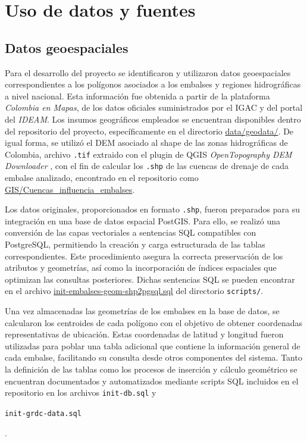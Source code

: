 \chapter{Uso de datos y fuentes}
\label{chp:3}

\section{Datos geoespaciales}
\label{sec:chp3-1}

Para el desarrollo del proyecto se identificaron y utilizaron datos geoespaciales correspondientes a los polígonos asociados a los embalses y regiones hidrográficas a nivel nacional. Esta información fue obtenida a partir de la plataforma \textit{Colombia en Mapas}, de los datos oficiales suministrados por el \ac{IGAC}\cite{colombiaenmapas} y del portal del \textit{IDEAM}\cite{ideam_zonificacion_hidrografica}. Los insumos geográficos empleados se encuentran disponibles dentro del repositorio del proyecto, específicamente en el directorio \url{data/geodata/}. De igual forma, se utilizó el DEM asociado al shape de las zonas hidrográficas de Colombia, archivo \texttt{.tif} extraido con el plugin de QGIS \textit{OpenTopography DEM Downloader} \cite{opentopography_tile_indexes_2025}, con el fin de calcular los \texttt{.shp} de las cuencas de drenaje de cada embalse analizado, encontrado en el repositorio como \url{GIS/Cuencas_influencia_embalses}.

Los datos originales, proporcionados en formato \texttt{.shp}, fueron preparados para su integración en una base de datos espacial PostGIS\cite{postgis}. Para ello, se realizó una conversión de las capas vectoriales a sentencias SQL compatibles con PostgreSQL, permitiendo la creación y carga estructurada de las tablas correspondientes. Este procedimiento asegura la correcta preservación de los atributos y geometrías, así como la incorporación de índices espaciales que optimizan las consultas posteriores. Dichas sentencias SQL se pueden encontrar en el archivo \url{init-embalses-geom-shp2pgsql.sql} del directorio \texttt{scripts/}.

Una vez almacenadas las geometrías de los embalses en la base de datos, se calcularon los centroides de cada polígono con el objetivo de obtener coordenadas representativas de ubicación. Estas coordenadas de latitud y longitud fueron utilizadas para poblar una tabla adicional que contiene la información general de cada embalse, facilitando su consulta desde otros componentes del sistema. Tanto la definición de las tablas como los procesos de inserción y cálculo geométrico se encuentran documentados y automatizados mediante scripts SQL incluidos en el repositorio en los archivos \texttt{init-db.sql} y {\raggedright \texttt{init-grdc-data.sql}}.

